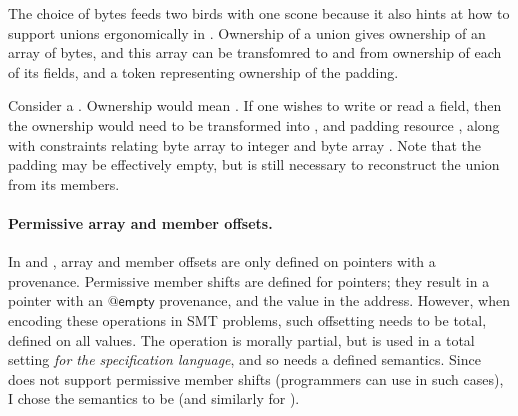 The choice of bytes feeds two birds with one scone because it also hints at how
to support unions ergonomically in . Ownership of a union gives
ownership of an array of bytes, and this array can be transfomred to and from
ownership of each of its fields, and a token representing ownership of the
padding.

Consider a .
Ownership  would mean . %
If one wishes to write or read a field, then the ownership would need to
be transformed into , and %
padding resource , along with %
constraints relating byte array  to integer  and byte
array . Note that the padding may be effectively empty, but is
still necessary to reconstruct the union from its members.


\paragraph{Permissive array and member offsets.}%
In  and , array and member offsets are only defined on
pointers with a provenance. Permissive member shifts are defined for
 pointers; they result in a pointer with an $@\mathsf{empty}$
provenance, and the  value in the address. However, when
encoding these operations in SMT problems, such offsetting needs to be total,
defined on all values. The operation is morally partial, but is used in a total
setting \emph{for the specification language}, and so needs a defined
semantics. Since  does not support permissive member shifts (programmers
can use  in such cases), I chose the semantics to be
 (and similarly %
for ).

